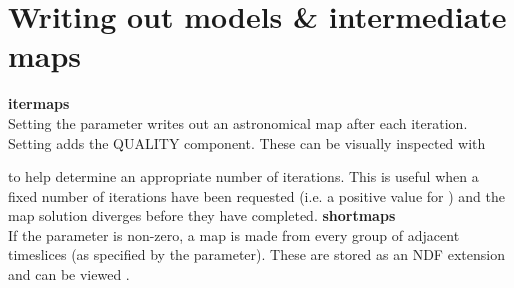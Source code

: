 \section{Writing out models \& intermediate maps}


\textbf{itermaps}\\
Setting the parameter  writes out an astronomical
map after each iteration. Setting  adds the QUALITY
component.  These can be visually inspected with

\begin{terminalv}
\end{terminalv}
to help determine an appropriate number of iterations. This is useful
when a fixed number of iterations have been requested (i.e. a positive
value for ) and the map solution diverges before
they have completed.
\newline\newline
\textbf{shortmaps}\\
If the parameter  is non-zero, a map is made from
every group of adjacent timeslices (as specified by the parameter).
These are stored as an NDF extension and can be viewed \gaia.

